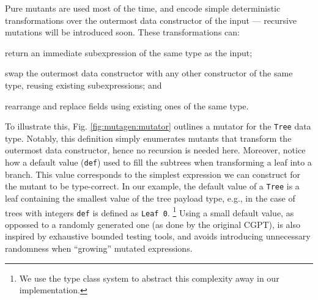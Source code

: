 \documentclass[sigconf,review,anonymous]{acmart}
\newcommand{\mutagen}{\textsc{Mutagen}\xspace}
\begin{document}
Pure mutants are used most of the time, and encode simple deterministic
transformations over the outermost data constructor of the input --- recursive
mutations will be introduced soon.
%
These transformations can:
%
\begin{inparaenum}
\item return an immediate subexpression of the same type as the input;
\item swap the outermost data constructor with any other constructor of the
  same type, reusing existing subexpressions; and
\item rearrange and replace fields using existing ones of the same type.
\end{inparaenum}
%
To illustrate this, Fig. \ref{fig:mutagen:mutator} outlines a mutator for the
\texttt{Tree} data type.
%
Notably, this definition simply enumerates mutants that transform the outermost
data constructor, hence no recursion is needed here.
%
Moreover, notice how a default value (\texttt{def}) used to fill the subtrees
when transforming a leaf into a branch.
%
This value corresponds to the simplest expression we can construct for the
mutant to be type-correct.
%
In our example, the default value of a \texttt{Tree} is a leaf containing the
smallest value of the tree payload type, e.g., in the case of trees with
integers \texttt{def} is defined as \texttt{Leaf 0}.
%
\footnote{We use the type class system to abstract this complexity away in our
  implementation.}
%
Using a small default value, as oppossed to a randomly generated one (as done by
the original CGPT), is also inspired by exhaustive bounded testing tools, and
avoids introducing unnecessary randomness when ``growing'' mutated expressions.

\end{document}
